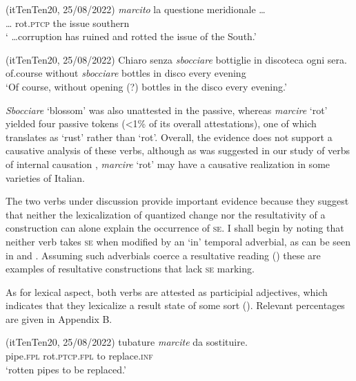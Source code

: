 \documentclass[output=paper,colorlinks,citecolor=brown
]{langscibook}
\begin{document}
\hspace*{\fill}(itTenTen20, 25/08/2022)\quad
\ea \label{bentley_example_16}
     \textit{marcito}	la			questione	meridionale \ldots   \\
    {\ldots} rot.\textsc{ptcp}		the		issue					southern \\
    \glt ‘ \ldots  corruption has ruined and rotted the issue of the South.’
\z


\hspace*{\fill}(itTenTen20, 25/08/2022)\quad
\ea \label{bentley_example_17}
    \gll Chiaro 			senza			\textit{sbocciare} bottiglie	in	discoteca		ogni		sera.  \\
 of.course		without	\textit{sbocciare}	bottles			in disco					every evening \\
    \glt ‘Of course, without opening (?) bottles in the disco every evening.’
\z

\textit{Sbocciare} ‘blossom’ was also unattested in the passive, whereas \textit{marcire} ‘rot’ yielded four passive tokens (<1\% of its overall attestations), one of which translates as ‘rust’ rather than ‘rot’. Overall, the evidence does not support a causative analysis of these verbs, although as was suggested in our study of verbs of internal causation \citep{bentley2023internally}, \textit{marcire} ‘rot’ may have a causative realization in some varieties of Italian.

The two verbs under discussion provide important evidence because they suggest that neither the lexicalization of quantized change nor the resultativity of a construction can alone explain the occurrence of \textsc{se}. I shall begin by noting that neither verb takes \textsc{se} when modified by an ‘in’ temporal adverbial, as can be seen in  and . Assuming such adverbials coerce a resultative reading (\cites[332—336]{dowty1979word}{hay1999scalar}) these are examples of resultative constructions that lack \textsc{se} marking.

As for lexical aspect, both verbs are attested as participial adjectives, which indicates that they lexicalize a result state of some sort (\cites[]{hout2004unaccusativity}[355]{bentley2006split}[283—284]{legendre2017auxiliaries}). Relevant percentages are given in Appendix B.

\hspace*{\fill}(itTenTen20, 25/08/2022)\quad
\ea \label{bentley_example_18}
    \gll tubature		\textit{marcite}					da 	sostituire.   \\
    pipe.\textsc{fpl}	rot.\textsc{ptcp}.\textsc{fpl}	to		replace.\textsc{inf}		 \\
    \glt ‘rotten pipes to be replaced.’
\z
\end{document}
